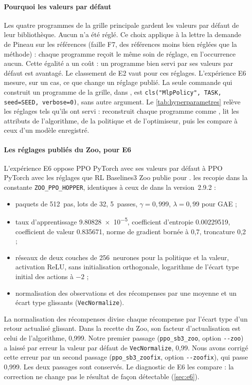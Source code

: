 \paragraph{Pourquoi les valeurs par défaut}
Les quatre programmes de la grille principale gardent les valeurs par défaut de leur bibliothèque. Aucun n'a
été réglé. Ce choix applique à la lettre la demande de Pineau sur les références (faille F7, des références moins bien réglées que la méthode) : chaque
programme
reçoit le même soin de réglage, en l'occurrence aucun. Cette égalité a un coût : un programme bien servi par ses
valeurs par défaut est avantagé. Le classement de E2 vaut pour ces réglages. L'expérience E6 mesure, sur un cas, ce que change un
réglage publié. La seule commande qui construit un programme de la grille, dans , est
\texttt{cls("MlpPolicy", TASK, seed=SEED, verbose=0)}, sans autre argument. Le \cref{tab:hyperparametres}
relève les réglages tels qu'ils ont servi :  reconstruit chaque programme comme
, lit les attributs de l'algorithme, de la politique et de l'optimiseur, puis les compare à ceux
d'un modèle enregistré.


\paragraph{Les réglages publiés du Zoo, pour E6}
L'expérience E6 oppose PPO PyTorch avec ses valeurs par défaut à PPO PyTorch avec les réglages que RL
Baselines3 Zoo publie pour .  les recopie dans la constante
\texttt{ZOO\_PPO\_HOPPER}, identiques à ceux de  dans la version~2.9.2 :
\begin{itemize}
  \item paquets de 512~pas, lots de 32, 5~passes, $\gamma = 0{,}999$, $\lambda = 0{,}99$ pour GAE ;
  \item taux d'apprentissage \num{9.80828e-5}, coefficient d'entropie \num{0.00229519}, coefficient de
    valeur \num{0.835671}, norme de gradient bornée à 0,7, troncature 0,2 ;
  \item réseaux de deux couches de 256~neurones pour la politique et la valeur, activation ReLU, sans
    initialisation orthogonale, logarithme de l'écart type initial des actions à $-2$ ;
  \item normalisation des observations et des récompenses par une moyenne et un écart type glissants
    (\texttt{VecNormalize}).
\end{itemize}
La normalisation des récompenses divise chaque récompense par l'écart type d'un retour actualisé glissant.
Dans la recette du Zoo, son facteur d'actualisation est celui de l'algorithme, 0,999. Notre premier passage
(\texttt{ppo\_sb3\_zoo}, option \texttt{-{}-zoo}) a laissé par erreur la valeur par défaut de
\texttt{VecNormalize}, 0,99. Nous avons corrigé cette erreur par un second passage (\texttt{ppo\_sb3\_zoofix},
option \texttt{-{}-zoofix}), qui passe 0,999. Les deux passages sont conservés. Le diagnostic de E6 les
compare : la correction ne change pas le résultat de façon détectable (\cref{sec:e6}).


